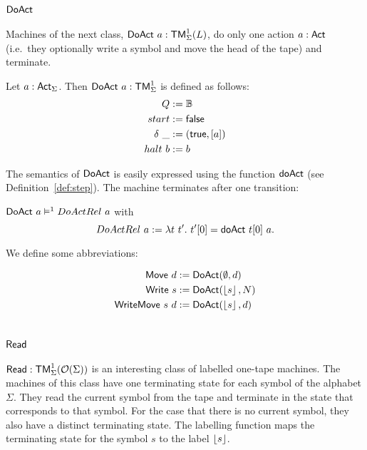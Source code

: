 \section{$\mathsf{DoAct}$}
\label{sec:DoAct}


Machines of the next class, $\mathsf{DoAct}~a : \mathsf{TM}_\Sigma^1(L)$, do only one action $a:\mathsf{Act}$ (i.e.\ they optionally write a symbol and move the head of
the tape) and terminate.
\begin{definition}[$\MS{DoAct}~a$][DoAct]
  \label{def:DoAct}
  Let $a:\mathsf{Act}_\Sigma$.  Then $\mathsf{DoAct}~a : \mathsf{TM}_\Sigma^1$ is defined as follows:
  \begin{align*}
    Q          &:= \mathbb{B} \\
    start      &:= \mathsf{false} \\
    \delta ~\_ &:= (\mathsf{true}, \left[ a \right]) \\
    halt   ~ b &:= b
  \end{align*}
\end{definition}
The semantics of $\mathsf{DoAct}$ is easily expressed using the function $\mathsf{doAct}$ (see Definition~\ref{def:step}).  The machine terminates after one
transition:
\begin{lemma}
  \label{lem:DoAct_Sem} $\mathsf{DoAct}~a \mathrel{\vDash^{1}} DoActRel~a$ with
  \[
    DoActRel~a := \lambda t~t'.~ t'[0] = \mathsf{doAct}~t[0]~a.
  \]
\end{lemma}
We define some abbreviations:
\begin{definition}
 \label{def:DoAct-derived} 
 \begin{align*}
   \mathsf{Move}       ~d &:= \mathsf{DoAct} (\emptyset, d) \\
   \mathsf{Write}    ~s   &:= \mathsf{DoAct} (\left\lfloor {s} \right\rfloor, N) \\
   \mathsf{WriteMove}~s~d &:= \mathsf{DoAct} (\left\lfloor {s} \right\rfloor, d)
 \end{align*}
\end{definition}


\section{$\mathsf{Read}$}
\label{sec:basic_machines-Read}

$\mathsf{Read} : \mathsf{TM}_\Sigma^1(\mathcal{O}(\Sigma))$ is an interesting class of labelled one-tape machines.  The machines of this class have one terminating
state for each symbol of the alphabet $\Sigma$.  They read the current symbol from the tape and terminate in the state that corresponds to that
symbol.  For the case that there is no current symbol, they also have a distinct terminating state.  The labelling function maps the terminating state
for the symbol $s$ to the label $\left\lfloor {s} \right\rfloor$.

